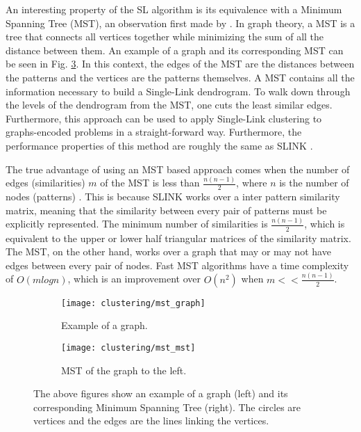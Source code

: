 An interesting property of the SL algorithm is its equivalence with a Minimum Spanning Tree (MST), an observation first made by \cite{Gower1969}.
In graph theory, a MST is a tree that connects all vertices together while minimizing the sum of all the distance between them.
An example of a graph and its corresponding MST can be seen in Fig. \ref{fig:mst example}.
In this context, the edges of the MST are the distances between the patterns and the vertices are the patterns themselves.
A MST contains all the information necessary to build a Single-Link dendrogram.
To walk down through the levels of the dendrogram from the MST, one cuts the least similar edges.
Furthermore, this approach can be used to apply Single-Link clustering to graphs-encoded problems in a straight-forward way.
Furthermore, the performance properties of this method are roughly the same as SLINK  \cite{Mullner2011}.

The true advantage of using an MST based approach comes when the number of edges (similarities) $m$ of the MST is less than $\frac{n(n-1)}{2}$, where $n$ is the number of nodes (patterns) \cite{starck2007astronomical}.
This is because SLINK works over a inter pattern similarity matrix, meaning that the similarity between every pair of patterns must be explicitly represented.
The minimum number of similarities is $\frac{n(n-1)}{2}$, which is equivalent to the upper or lower half triangular matrices of the similarity matrix.
The MST, on the other hand, works over a graph that may or may not have edges between every pair of nodes.
Fast MST algorithms have a time complexity of $O(m log n)$, which is an improvement over $O(n^2)$ when $m << \frac{n(n-1)}{2}$.


\begin{figure}[!ht]
    \centering
    \begin{subfigure}[b]{0.3\textwidth}
        \centering
        \texttt{[image: clustering/mst\_graph]}
        \caption{Example of a graph.}
        \label{fig:graph}
    \end{subfigure}
    \hspace{30pt}
    \begin{subfigure}[b]{0.3\textwidth}
        \centering
        \texttt{[image: clustering/mst\_mst]}
        \caption{MST of the graph to the left.}
        \label{fig:graph mst}
    \end{subfigure}

    \caption{The above figures show an example of a graph (left) and its corresponding Minimum Spanning Tree (right). The circles are vertices and the edges are the lines linking the vertices.}
    \label{fig:mst example}
\end{figure}

